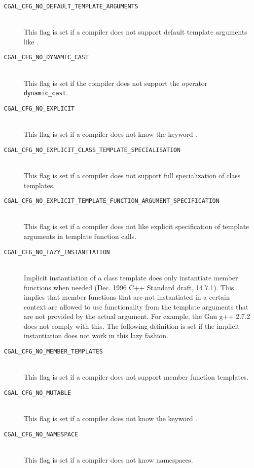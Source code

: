 \begin{description}
\item[{\tt CGAL\_CFG\_NO\_DEFAULT\_TEMPLATE\_ARGUMENTS}]~\\
  This flag is set if a compiler does not support default template
  arguments like .
 
\item[{\tt CGAL\_CFG\_NO\_DYNAMIC\_CAST}]~\\ 
  This flag is set
  if the compiler does not support the operator \texttt{dynamic\_cast}.

\item[{\tt CGAL\_CFG\_NO\_EXPLICIT}]~\\
  This flag is set if a compiler does not know the keyword
  .

\item[{\tt CGAL\_CFG\_NO\_EXPLICIT\_CLASS\_TEMPLATE\_SPECIALISATION}]~\\
  This flag is set if a compiler does not support full specialization
  of class templates.

\item[{\tt CGAL\_CFG\_NO\_EXPLICIT\_TEMPLATE\_FUNCTION\_ARGUMENT\_SPECIFICATION}]~\\
  This flag is set if a compiler does not like explicit specification
  of template arguments in template function calls.

\item[{\tt CGAL\_CFG\_NO\_LAZY\_INSTANTIATION}]~\\
  Implicit instantiation of a class template does only instantiate
  member functions when needed (Dec. 1996 C++ Standard draft, 14.7.1).
  This implies that member functions that are not instantiated in a
  certain context are allowed to use functionality from the template
  arguments that are not provided by the actual argument. For example,
  the Gnu g++ 2.7.2 does not comply with this. The following definition
  is set if the implicit instantiation does not work in this lazy
  fashion.

\item[{\tt CGAL\_CFG\_NO\_MEMBER\_TEMPLATES}]~\\
  This flag is set if a compiler does not support member function
  templates.

\item[{\tt CGAL\_CFG\_NO\_MUTABLE}]~\\
  This flag is set if a compiler does not know the keyword
  .

\item[{\tt CGAL\_CFG\_NO\_NAMESPACE}]~\\
 This flag is set if a compiler does not know namespaces.


\end{description}
